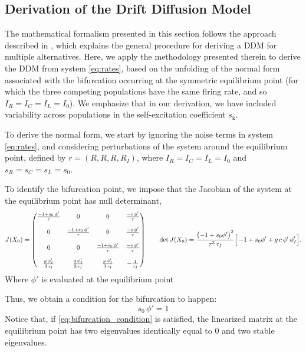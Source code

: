 \documentclass[12,twoside]{TFG-GM}
\theoremstyle{definition}
\theoremstyle{remark}
\newcommand{\kk}{\mathrm{k}}
\begin{document}
\subsection{Derivation of the Drift Diffusion Model}
The mathematical formalism presented in this section follows the approach described in \cite{roxin2019}, which explains the general procedure for deriving a DDM for multiple alternatives. Here, we apply the methodology presented therein to derive the DDM from system \eqref{eq:rates}, based on the unfolding of the normal form associated with the bifurcation occurring at the symmetric equilibrium point (for which the three competing populations have the same firing rate, and so $I_R = I_C = I_L = I_0$). We emphasize that in our derivation, we have included variability across populations in the self-excitation coefficient $s_\kk$.

To derive the normal form, we start by ignoring the noise terms in system \eqref{eq:rates}, and considering perturbations of the system around the equilibrium point, defined by $r = (R, R, R, R_I)$, where $I_R = I_C = I_L = I_0$ and $s_R = s_C = s_L = s_0$.

To identify the bifurcation point, we impose that the Jacobian of the system at the equilibrium point has null determinant, 
\smallskip
\[
J(X_0)=
\begin{pmatrix}
\frac{-1 + s_0\,\phi'}{\tau}& 0 & 0 & \frac{-c\,\phi'}{\tau}
\\[1em]
0 & \frac{-1 + s_0\,\phi'}{\tau}& 0 & \frac{-c\,\phi'}{\tau}
\\[1em]
0 & 0 & \frac{-1 + s_0\,\phi'}{\tau}& \frac{-c\,\phi'}{\tau}
\\[1em]
\frac{g\,\phi'_I}{3\,\tau_I}& \frac{g\,\phi'_I}{3\,\tau_I}& \frac{g\,\phi'_I}{3\,\tau_I}& -\frac{1}{\tau_I}
\end{pmatrix}
\qquad
\det J(X_0)
=\frac{\bigl(-1 + s_0\phi'\bigr)^2}{\tau^3\,\tau_I}
\Bigl[\,-1 + s_0\phi' + g\,c\,\phi'\,\phi'_I\Bigr].
\]
\bigskip
Where $\phi'$ is evaluated at the equilibrium point

Thus, we obtain a condition for the bifurcation to happen:
\begin{equation}
  s_0\,\phi' = 1
  \label{eq:bifurcation_condition}
\end{equation}
Notice that, if \eqref{eq:bifurcation_condition} is satisfied, the linearized matrix at the equilibrium point has two eigenvalues identically equal to 0 and two stable eigenvalues. 
\end{document}
